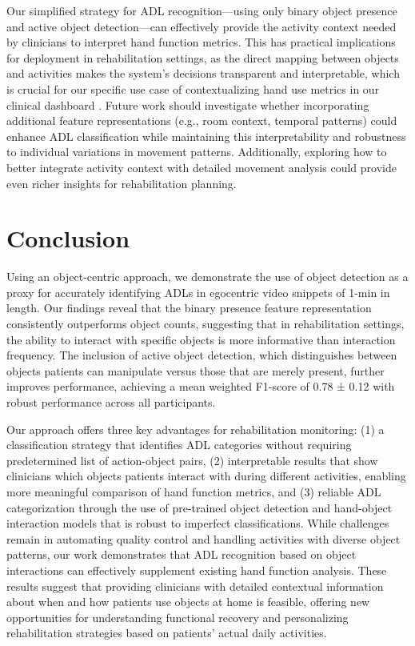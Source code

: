 \documentclass[journal,twoside,web]{ieeecolor}
\begin{document}
Our simplified strategy for ADL recognition---using only binary object presence and active object detection---can effectively provide the activity context needed by clinicians to interpret hand function metrics. This has practical implications for deployment in rehabilitation settings, as the direct mapping between objects and activities makes the system's decisions transparent and interpretable, which is crucial for our specific use case of contextualizing hand use metrics in our clinical dashboard \cite{Kadambi2023-iv}. Future work should investigate whether incorporating additional feature representations (e.g., room context, temporal patterns) could enhance ADL classification while maintaining this interpretability and robustness to individual variations in movement patterns. Additionally, exploring how to better integrate activity context with detailed movement analysis could provide even richer insights for rehabilitation planning.

\section{Conclusion}
Using an object-centric approach, we demonstrate the use of object detection as a proxy for accurately identifying ADLs in egocentric video snippets of 1-min in length. Our findings reveal that the binary presence feature representation consistently outperforms object counts, suggesting that in rehabilitation settings, the ability to interact with specific objects is more informative than interaction frequency. The inclusion of active object detection, which distinguishes between objects patients can manipulate versus those that are merely present, further improves performance, achieving a mean weighted F1-score of 0.78 ± 0.12 with robust performance across all participants.

Our approach offers three key advantages for rehabilitation monitoring: (1) a classification strategy that identifies ADL categories without requiring predetermined list of action-object pairs, (2) interpretable results that show clinicians which objects patients interact with during different activities, enabling more meaningful comparison of hand function metrics, and (3) reliable ADL categorization through the use of pre-trained object detection and hand-object interaction models that is robust to imperfect classifications. While challenges remain in automating quality control and handling activities with diverse object patterns, our work demonstrates that ADL recognition based on object interactions can effectively supplement existing hand function analysis. These results suggest that providing clinicians with detailed contextual information about when and how patients use objects at home is feasible, offering new opportunities for understanding functional recovery and personalizing rehabilitation strategies based on patients' actual daily activities.

\appendices


\end{document}
